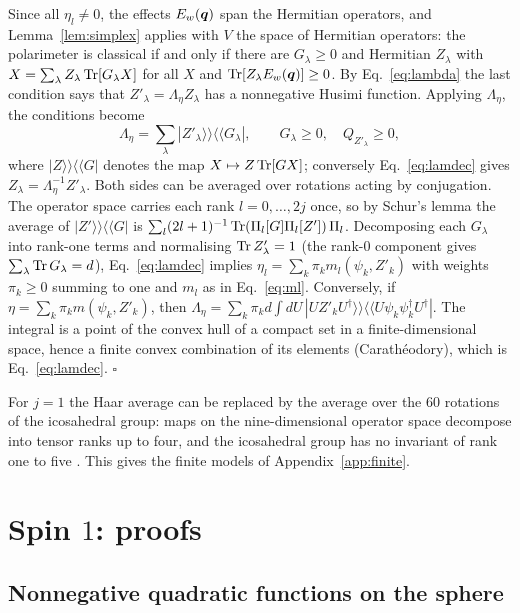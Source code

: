 Since all $\eta_l\ne0$, the effects $E_w(\bm{q})$ span the Hermitian operators, and Lemma~\ref{lem:simplex} applies with $V$ the space of Hermitian operators: the polarimeter is classical if and only if there are $G_\lambda\ge0$ and Hermitian $Z_\lambda$ with $X=\sum_\lambda Z_\lambda\operatorname{Tr}[G_\lambda X]$ for all $X$ and $\operatorname{Tr}[Z_\lambda E_w(\bm{q})]\ge0$. By Eq.~\eqref{eq:lambda} the last condition says that $Z'_\lambda=\Lambda_\eta Z_\lambda$ has a nonnegative Husimi function. Applying $\Lambda_\eta$, the conditions become
\begin{equation}
\Lambda_\eta=\sum_\lambda|Z'_\lambda\rangle\!\rangle\langle\!\langle G_\lambda|,\qquad G_\lambda\ge0,\quad Q_{Z'_\lambda}\ge0 ,
\label{eq:lamdec}
\end{equation}
where $|Z\rangle\!\rangle\langle\!\langle G|$ denotes the map $X\mapsto Z\operatorname{Tr}[GX]$; conversely Eq.~\eqref{eq:lamdec} gives $Z_\lambda=\Lambda_\eta^{-1}Z'_\lambda$. Both sides can be averaged over rotations acting by conjugation. The operator space carries each rank $l=0,\dots,2j$ once, so by Schur's lemma the average of $|Z'\rangle\!\rangle\langle\!\langle G|$ is $\sum_l(2l+1)^{-1}\operatorname{Tr}(\Pi_l[G]\Pi_l[Z'])\,\Pi_l$. Decomposing each $G_\lambda$ into rank-one terms and normalising $\operatorname{Tr} Z'_\lambda=1$ (the rank-$0$ component gives $\sum_\lambda\operatorname{Tr} G_\lambda=d$), Eq.~\eqref{eq:lamdec} implies $\eta_l=\sum_k\pi_km_l(\psi_k,Z'_k)$ with weights $\pi_k\ge0$ summing to one and $m_l$ as in Eq.~\eqref{eq:ml}. Conversely, if $\eta=\sum_k\pi_km(\psi_k,Z'_k)$, then $\Lambda_\eta=\sum_k\pi_kd\int\!dU\,|UZ'_kU^\dagger\rangle\!\rangle\langle\!\langle U\psi_k\psi_k^\dagger U^\dagger|$. The integral is a point of the convex hull of a compact set in a finite-dimensional space, hence a finite convex combination of its elements (Carath\'eodory), which is Eq.~\eqref{eq:lamdec}. \hfill$\square$

For $j=1$ the Haar average can be replaced by the average over the $60$ rotations of the icosahedral group: maps on the nine-dimensional operator space decompose into tensor ranks up to four, and the icosahedral group has no invariant of rank one to five \cite{klein1956}. This gives the finite models of Appendix~\ref{app:finite}.

\section{Spin $1$: proofs}
\label{app:spin1}

\subsection{Nonnegative quadratic functions on the sphere}

